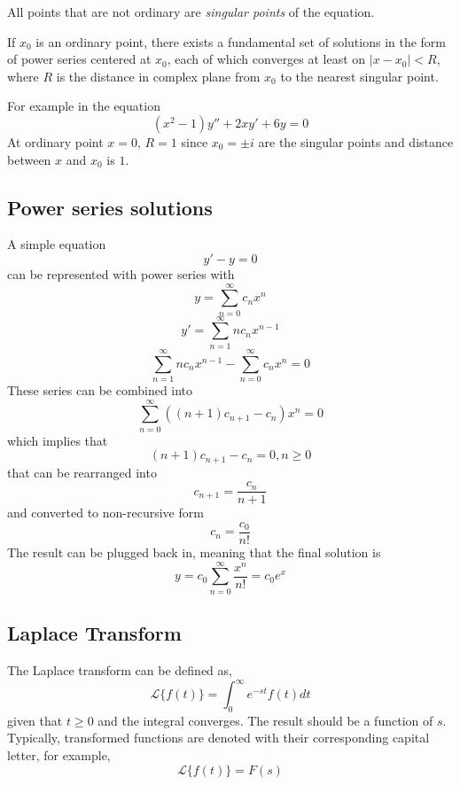 All points that are not ordinary are \textit{singular points} of the equation.

\begin{theorem}
    If $x_0$ is an ordinary point, there exists a fundamental set of solutions in the form of power series centered at $x_0$, each of which converges at least on $|x - x_0| < R$, where $R$ is the distance in complex plane from $x_0$ to the nearest singular point.
\end{theorem}

For example in the equation
\[
    (x^2 - 1)y'' + 2xy' + 6y = 0
\]
At ordinary point $x = 0$, $R = 1$ since $x_0 = \pm i$ are the singular points and distance between $x$ and $x_0$ is $1$.

\subsection{Power series solutions}

A simple equation
\[
    y' - y = 0
\]
can be represented with power series with
\[
    y = \sum_{n = 0}^{\infty} c_n x^n
\]
\[
    y' = \sum_{n = 1}^{\infty} n c_n x^{n - 1}
\]
\[
    \sum_{n = 1}^{\infty} n c_n x^{n - 1} - \sum_{n = 0}^{\infty} c_n x^n = 0
\]
These series can be combined into
\[
    \sum_{n = 0}^{\infty} ((n + 1)c_{n + 1} - c_n)x^n = 0
\]
which implies that
\[
    (n + 1)c_{n + 1} - c_n = 0, n \geq 0
\]
that can be rearranged into
\[
    c_{n + 1} = \frac{c_n}{n + 1}
\]
and converted to non-recursive form
\[
    c_n = \frac{c_0}{n!}
\]
The result can be plugged back in, meaning that the final solution is
\[
    y = c_0 \sum_{n = 0}^{\infty} \frac{x^n}{n!} = c_0 e^x
\]
















\subsection{Laplace Transform}

The Laplace transform can be defined as,
\[
    \mathscr{L}\{f(t)\} = \int_0^\infty e^{-st} f(t) dt
\]
given that $t \ge 0$ and the integral converges. The result should be a function of $s$. Typically, transformed functions are denoted with their corresponding capital letter, for example,
\[
    \mathscr{L}\{f(t)\} = F(s)
\]

